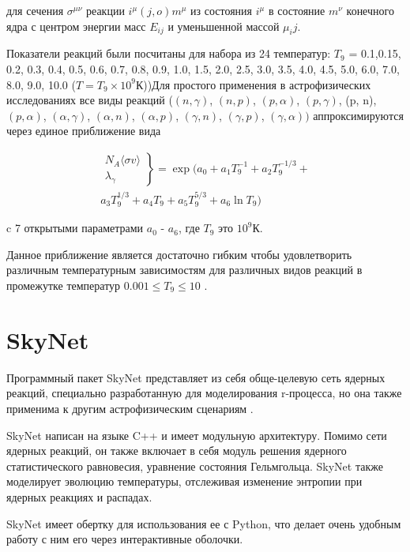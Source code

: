 \documentclass[%
master,    %
natbib,      %
subf,        %
href,        %
colorlinks,  %
]{disser}
\begin{document}
для сечения $\sigma^{\mu\nu}$ реакции $i^\mu(j,o)m^\mu$ из состояния $i^\mu$ в состояние $m^\nu$ конечного ядра с центром энергии масс $E_{ij}$ и уменьшенной массой $\mu_ij$.

Показатели реакций были посчитаны для набора из 24 температур: $T_9$ = 0.1,0.15, 0.2, 0.3, 0.4, 0.5, 0.6, 0.7, 0.8, 0.9, 1.0, 1.5, 2.0, 2.5, 3.0, 3.5, 4.0, 4.5, 5.0, 6.0, 7.0, 8.0, 9.0, 10.0 ($T = T_9 \times 10^{9}\text{К}$))Для простого применения в астрофизических исследованиях все виды реакций ($(n,\gamma)$, $(n,p)$, $(p,\alpha)$, $(p, \gamma)$, (p, n), $(p, \alpha)$, $(\alpha, \gamma)$, $(\alpha, n)$, $(\alpha, p)$, $(\gamma, n)$, $(\gamma, p)$, $(\gamma, \alpha))$ аппроксимируются через единое приближение вида

\begin{equation}
\label{eq:system}
\begin{split}
\left.
	\begin{array}{ccc}
		N_{A}\langle \sigma v \rangle \\
		\lambda_\gamma
	\end{array}
\right\}
 = \exp (a_0 + a_1 T_9^{-1} + a_2 T_9^{-1/3} + \\
a_3 T_9^{1/3} + a_4 T_9 + a_5 T_9^{5/3} + a_6 \ln T_9)
\end{split}
\end{equation}

c 7 открытыми параметрами $a_0$ - $a_6$, где $T_9$ это $10^9$К.

Данное приближение является достаточно гибким чтобы удовлетворить различным температурным зависимостям для различных видов реакций в промежутке температур $0.001 \le T_9 \le 10$ \cite{rates}.

\section{SkyNet}

Программный пакет SkyNet представляет из себя обще-целевую сеть ядерных реакций, специально разработанную для моделирования r-процесса, но она также применима к другим астрофизическим сценариям \cite{skynet}.

SkyNet написан на языке C++ и имеет модульную архитектуру. Помимо сети ядерных реакций, он также включает в себя модуль решения ядерного статистического равновесия, уравнение состояния Гельмгольца. SkyNet также моделирует эволюцию температуры, отслеживая изменение энтропии при ядерных реакциях и распадах.

SkyNet имеет обертку для использования ее с Python, что делает очень удобным работу с ним его через интерактивные оболочки.
\end{document}

